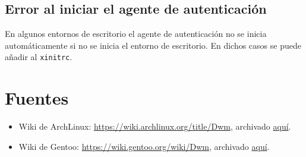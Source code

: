 \documentclass{article}
\begin{document}
	\subsection{Error al iniciar el agente de autenticación}
	En algunos entornos de escritorio el agente de autenticación no se inicia
	automáticamente si no se inicia el entorno de escritorio. En dichos casos
	se puede añadir al \texttt{xinitrc}.

	\section{Fuentes}
	\begin{itemize}
		\item Wiki de ArchLinux: \href{https://wiki.archlinux.org/title/Dwm}
		{https://wiki.archlinux.org/title/Dwm}, archivado \href{https://web.archive.org/web/20260217235550/https://wiki.archlinux.org/title/Dwm}
		{aquí}.
		\item Wiki de Gentoo: \href{https://wiki.gentoo.org/wiki/Dwm}
		{https://wiki.gentoo.org/wiki/Dwm}, archivado \href{https://web.archive.org/web/20260209204730/https://wiki.gentoo.org/wiki/Dwm}
		{aquí}.
	\end{itemize}
    
\end{document}
